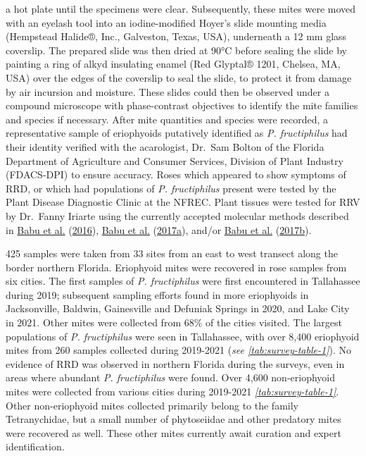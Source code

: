\documentclass[12pt,final,CPage]{ufthesis}
\renewcommand{\hypertarget}[2]{\leavevmode\oldhypertarget{#1}{#2}}
\begin{document}
{a hot plate until the specimens were clear. Subsequently, these mites were moved with an eyelash tool into an iodine-modified Hoyer's slide mounting media (Hempstead Halide®, Inc., Galveston, Texas, USA), underneath a 12 \si{\milli\metre} glass coverslip. The prepared slide was then dried at 90°C before sealing the slide by painting a ring of alkyd insulating enamel (Red Glyptal® 1201, Chelsea, MA, USA) over the edges of the coverslip to seal the slide, to protect it from damage by air incursion and moisture. These slides could then be observed under a compound microscope with phase-contrast objectives to identify the mite families and species if necessary. After mite quantities and species were recorded, a representative sample of eriophyoids putatively identified as \emph{P. fructiphilus} had their identity verified with the acarologist, Dr.~Sam Bolton of the Florida Department of Agriculture and Consumer Services, Division of Plant Industry (FDACS-DPI) to ensure accuracy. Roses which appeared to show symptoms of RRD, or which had populations of \emph{P. fructiphilus} present were tested by the Plant Disease Diagnostic Clinic at the NFREC. Plant tissues were tested for RRV by Dr.~Fanny Iriarte using the currently accepted molecular methods described in \protect\hyperlink{ref-Babu2016}{Babu et al.} (\protect\hyperlink{ref-Babu2016}{2016}), \protect\hyperlink{ref-Babu2017a}{Babu et al.} (\protect\hyperlink{ref-Babu2017a}{2017a}), and/or \protect\hyperlink{ref-Babu2017b}{Babu et al.} (\protect\hyperlink{ref-Babu2017b}{2017b}).

  \hypertarget{results-survey}{%
  \section{Results}\label{results-survey}}

  425 samples were taken from 33 sites from an east to west transect along the border northern Florida. Eriophyoid mites were recovered in rose samples from six cities. The first samples of \emph{P. fructiphilus} were first encountered in Tallahassee during 2019; subsequent sampling efforts found in more eriophyoids in Jacksonville, Baldwin, Gainesville and Defuniak Springs in 2020, and Lake City in 2021. Other mites were collected from 68\% of the cities visited. The largest populations of \emph{P. fructiphilus} were seen in Tallahassee, with over 8,400 eriophyoid mites from 260 samples collected during 2019-2021 (\emph{see \ref{tab:survey-table-1}}). No evidence of RRD was observed in northern Florida during the surveys, even in areas where abundant \emph{P. fructiphilus} were found. Over 4,600 non-eriophyoid mites were collected from various cities during 2019-2021 \emph{\ref{tab:survey-table-1}}. Other non-eriophyoid mites collected primarily belong to the family Tetranychidae, but a small number of phytoseiidae and other predatory mites were recovered as well. These other mites currently await curation and expert identification.

}
\end{document}
